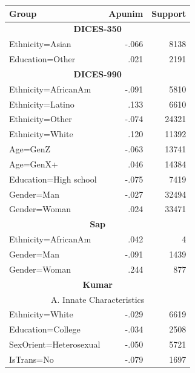 \documentclass[11pt]{article}
\theoremstyle{definition}
\theoremstyle{plain}
\begin{document}
\begin{table}[t]
	\small
	\centering
	
	\begin{tabularx}{\columnwidth}{X r r}
		\toprule
		\textbf{Group} & \textbf{Apunim} & \textbf{Support} \\
		\midrule
		
		\multicolumn{3}{c}{\textbf{DICES-350}} \\
		\midrule
		
		\rowcolor{gray!15}
		Ethnicity=Asian & -.066 & 8138 \\
		Education=Other & .021 & 2191 \\
		
		\midrule
		\multicolumn{3}{c}{\textbf{DICES-990}} \\
		\midrule
		\rowcolor{gray!15}
		Ethnicity=AfricanAm & -.091 & 5810 \\
		\rowcolor{gray!15}
		Ethnicity=Latino & .133 & 6610 \\
		\rowcolor{gray!15}
		Ethnicity=Other & -.074 & 24321 \\
		\rowcolor{gray!15}
		Ethnicity=White & .120 & 11392 \\
		Age=GenZ & -.063 & 13741 \\
		Age=GenX+ & .046 & 14384 \\
		Education=High school & -.075 & 7419 \\
		\rowcolor{gray!15}
		Gender=Man & -.027 & 32494 \\
		\rowcolor{gray!15}
		Gender=Woman & .024 & 33471 \\
		
		\midrule
		\multicolumn{3}{c}{\textbf{Sap}} \\
		\midrule
		\rowcolor{gray!15}
		Ethnicity=AfricanAm & .042 & 4 \\
		\rowcolor{gray!15}
		Gender=Man & -.091 & 1439 \\
		\rowcolor{gray!15}
		Gender=Woman & .244 & 877 \\
		
		\midrule
		\multicolumn{3}{c}{\textbf{Kumar}} \\
		\midrule
		
		\multicolumn{3}{c}{A. Innate Characteristics} \\
		\midrule 
		\rowcolor{gray!15}
		Ethnicity=White & -.029 & 6619 \\
		Education=College & -.034 & 2508 \\
		SexOrient=Heterosexual & -.050 & 5721 \\
		\rowcolor{gray!15}
		IsTrans=No & -.079 & 1697 \\
		

\end{tabularx}
\end{table}
\end{document}
